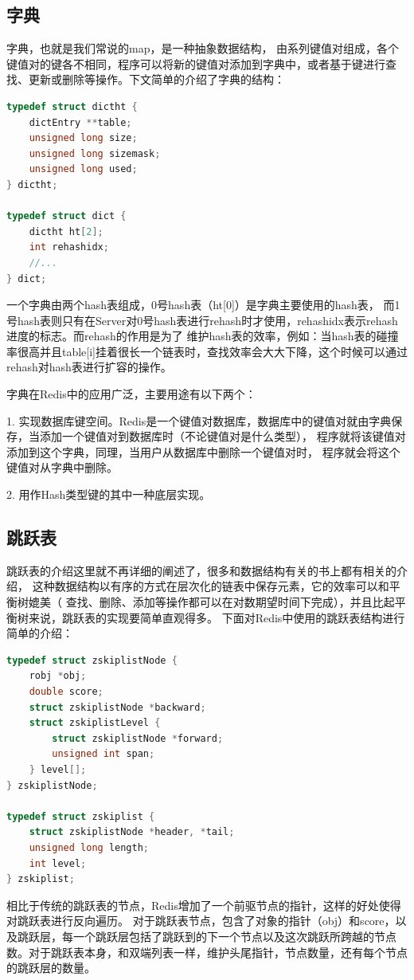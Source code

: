 \documentclass{zjutthesis}
\begin{document}
\subsection{字典}
字典\cite{阮若夷2011redis上}，也就是我们常说的map，是一种抽象数据结构， 由系列键值对组成，各个键值对的键各不相同，程序可以将新的键值对添加到字典中，或者基于键进行查找、更新或删除等操作。下文简单的介绍了字典的结构：
\begin{lstlisting}[language=C]
typedef struct dictht {
    dictEntry **table;
    unsigned long size;
    unsigned long sizemask;
    unsigned long used;
} dictht;

typedef struct dict {
    dictht ht[2];
    int rehashidx;
    //...
} dict;
\end{lstlisting}
一个字典由两个hash表组成，0号hash表（ht[0]）是字典主要使用的hash表， 而1号hash表则只有在Server对0号hash表进行rehash时才使用，rehashidx表示rehash进度的标志。而rehash的作用是为了
维护hash表的效率，例如：当hash表的碰撞率很高并且table[i]挂着很长一个链表时，查找效率会大大下降，这个时候可以通过rehash对hash表进行扩容的操作。

字典在Redis中的应用广泛，主要用途有以下两个：

1. 实现数据库键空间。Redis是一个键值对数据库，数据库中的键值对就由字典保存，当添加一个键值对到数据库时（不论键值对是什么类型）， 程序就将该键值对添加到这个字典，同理，当用户从数据库中删除一个键值对时， 程序就会将这个键值对从字典中删除。

2. 用作Hash类型键的其中一种底层实现。

\subsection{跳跃表}
跳跃表\cite{weiss2004数据结构与算法分析}的介绍这里就不再详细的阐述了，很多和数据结构有关的书上都有相关的介绍， 这种数据结构以有序的方式在层次化的链表中保存元素，它的效率可以和平衡树\cite{严蔚敏2012数据结构}媲美（ 查找、删除、添加等操作都可以在对数期望时间下完成），并且比起平衡树来说，跳跃表的实现要简单直观得多。
下面对Redis中使用的跳跃表结构进行简单的介绍：
\begin{lstlisting}[language=C]
typedef struct zskiplistNode {
    robj *obj;
    double score;
    struct zskiplistNode *backward;
    struct zskiplistLevel {
        struct zskiplistNode *forward;
        unsigned int span;
    } level[];
} zskiplistNode;

typedef struct zskiplist {
    struct zskiplistNode *header, *tail;
    unsigned long length;
    int level;
} zskiplist;
\end{lstlisting}
相比于传统的跳跃表的节点，Redis增加了一个前驱节点的指针，这样的好处使得对跳跃表进行反向遍历。
对于跳跃表节点，包含了对象的指针（obj）和score，以及跳跃层，每一个跳跃层包括了跳跃到的下一个节点以及这次跳跃所跨越的节点数。对于跳跃表本身，和双端列表一样，维护头尾指针，节点数量，还有每个节点的跳跃层的数量。
\end{document}
